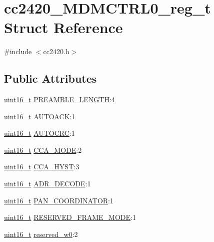 \hypertarget{structcc2420___m_d_m_c_t_r_l0__reg__t}{}\section{cc2420\+\_\+\+M\+D\+M\+C\+T\+R\+L0\+\_\+reg\+\_\+t Struct Reference}
\label{structcc2420___m_d_m_c_t_r_l0__reg__t}


{\ttfamily \#include $<$cc2420.\+h$>$}

\subsection*{Public Attributes}
\begin{DoxyCompactItemize}
\item 
\hyperlink{_p_e___types_8h_a1f1825b69244eb3ad2c7165ddc99c956}{uint16\+\_\+t} \hyperlink{structcc2420___m_d_m_c_t_r_l0__reg__t_af679b0ef2d1b633cbfe0c204a2235ec6}{P\+R\+E\+A\+M\+B\+L\+E\+\_\+\+L\+E\+N\+G\+TH}\+:4
\item 
\hyperlink{_p_e___types_8h_a1f1825b69244eb3ad2c7165ddc99c956}{uint16\+\_\+t} \hyperlink{structcc2420___m_d_m_c_t_r_l0__reg__t_a33574402738da3537ddfeffe38cf132f}{A\+U\+T\+O\+A\+CK}\+:1
\item 
\hyperlink{_p_e___types_8h_a1f1825b69244eb3ad2c7165ddc99c956}{uint16\+\_\+t} \hyperlink{structcc2420___m_d_m_c_t_r_l0__reg__t_abbe426036ac61bbf810c2082d73bda01}{A\+U\+T\+O\+C\+RC}\+:1
\item 
\hyperlink{_p_e___types_8h_a1f1825b69244eb3ad2c7165ddc99c956}{uint16\+\_\+t} \hyperlink{structcc2420___m_d_m_c_t_r_l0__reg__t_acb90ca84a1e856074b91e0431fae71f1}{C\+C\+A\+\_\+\+M\+O\+DE}\+:2
\item 
\hyperlink{_p_e___types_8h_a1f1825b69244eb3ad2c7165ddc99c956}{uint16\+\_\+t} \hyperlink{structcc2420___m_d_m_c_t_r_l0__reg__t_a77fbf4316378d718c40e7837182fb96c}{C\+C\+A\+\_\+\+H\+Y\+ST}\+:3
\item 
\hyperlink{_p_e___types_8h_a1f1825b69244eb3ad2c7165ddc99c956}{uint16\+\_\+t} \hyperlink{structcc2420___m_d_m_c_t_r_l0__reg__t_a1b4c3244ad3e469192740220114686d0}{A\+D\+R\+\_\+\+D\+E\+C\+O\+DE}\+:1
\item 
\hyperlink{_p_e___types_8h_a1f1825b69244eb3ad2c7165ddc99c956}{uint16\+\_\+t} \hyperlink{structcc2420___m_d_m_c_t_r_l0__reg__t_a2699b097a368a8c6b8fb28489b45f393}{P\+A\+N\+\_\+\+C\+O\+O\+R\+D\+I\+N\+A\+T\+OR}\+:1
\item 
\hyperlink{_p_e___types_8h_a1f1825b69244eb3ad2c7165ddc99c956}{uint16\+\_\+t} \hyperlink{structcc2420___m_d_m_c_t_r_l0__reg__t_a15d3de5639d13a6edfc8004cbc9cce8e}{R\+E\+S\+E\+R\+V\+E\+D\+\_\+\+F\+R\+A\+M\+E\+\_\+\+M\+O\+DE}\+:1
\item 
\hyperlink{_p_e___types_8h_a1f1825b69244eb3ad2c7165ddc99c956}{uint16\+\_\+t} \hyperlink{structcc2420___m_d_m_c_t_r_l0__reg__t_ae4feeecd96c3d1611db9260e8e588490}{reserved\+\_\+w0}\+:2
\end{DoxyCompactItemize}


